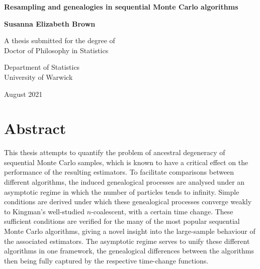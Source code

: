 \documentclass[oneside]{scrbook} %
\theoremstyle{definition}
\newcommand{\1}[1]{\mathbbm{1}_{#1}} %
\begin{document}
\begin{titlepage}
\centering
\vspace*{5cm}
\begin{LARGE}\bfseries
Resampling and genealogies in sequential Monte Carlo algorithms\par \end{LARGE} 
\vspace{1.5cm} 
\begin{Large}\bfseries
Susanna Elizabeth Brown\par
\end{Large}
\vspace{3cm}
\begin{large}
A thesis submitted for the degree of\\Doctor of Philosophy in Statistics \par
\vspace{1.5cm}
Department of Statistics\\ University of Warwick \par
\vspace{1.5cm}
August 2021 %
\end{large}
\end{titlepage}


\frontmatter


\chapter*{Abstract}
This thesis attempts to quantify the problem of ancestral degeneracy of sequential Monte Carlo samples, which is known to  have a critical effect on the performance of the resulting estimators.
To facilitate comparisons between different algorithms, the induced genealogical processes are analysed under an asymptotic regime in which the number of particles tends to infinity. 
Simple conditions are derived under which these genealogical processes converge weakly to Kingman's well-studied $n$-coalescent, with a certain time change.
These sufficient conditions are verified for the many of the most popular sequential Monte Carlo algorithms, giving a novel insight into the large-sample behaviour of the associated estimators.
The asymptotic regime serves to unify these different algorithms in one framework, the genealogical differences between the algorithms then being fully captured by the respective time-change functions.


\end{document}
